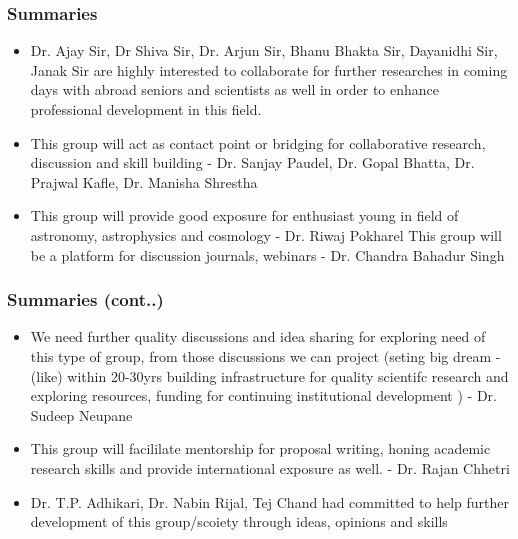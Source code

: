 \documentclass{beamer}
\begin{document}
\begin{frame}
\frametitle{\bf Summaries }

\color{red} \bf 
\begin{itemize}
\item \color{blue} Dr. Ajay Sir, Dr Shiva Sir, Dr. Arjun Sir, Bhanu Bhakta Sir, Dayanidhi Sir, Janak Sir are highly interested to collaborate for further researches in coming days with abroad seniors and scientists as well in order to enhance professional development in this field. 
\item \color{red} This group will act as contact point or bridging for collaborative research, discussion and skill building - Dr. Sanjay Paudel, Dr. Gopal Bhatta, Dr. Prajwal Kafle, Dr. Manisha Shrestha
\item \color{blue}This group will provide good exposure for enthusiast young in field of astronomy, astrophysics and cosmology - Dr. Riwaj Pokharel 
This group will be a platform for discussion journals, webinars - Dr. Chandra Bahadur Singh
\end{itemize}

\end{frame}
\begin{frame}
\frametitle{\bf Summaries (cont..) }
\begin{itemize}
	\bf 
	\item \color{red} We need further quality discussions and idea sharing for exploring need of this type of group, from those discussions we can project (seting big dream - (like) within 20-30yrs building infrastructure for quality scientifc research and exploring resources, funding for continuing institutional development ) -  Dr. Sudeep Neupane
	
	
	\item \color{blue} This group will facililate mentorship for proposal writing, honing academic research skills and provide international exposure as well. - Dr. Rajan Chhetri
	
	\item \color{red}  Dr. T.P. Adhikari, Dr. Nabin Rijal, Tej Chand had committed to help further development of this group/scoiety through ideas, opinions and skills 
	

\end{itemize}

\end{frame}
\end{document}
